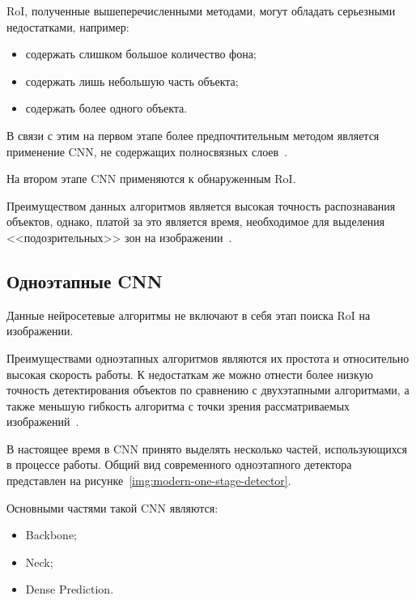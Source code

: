 RoI, полученные вышеперечисленными методами, могут обладать серьезными недостатками, например:
\begin{itemize}[label=---]
    \item содержать слишком большое количество фона;
    \item содержать лишь небольшую часть объекта;
    \item содержать более одного объекта.
\end{itemize}

В связи с этим на первом этапе более предпочтительным методом является применение CNN, не содержащих полносвязных слоев~\cite{realtime-recognition-algorythm}.

На втором этапе CNN применяются к обнаруженным RoI.

Преимуществом данных алгоритмов является высокая точность распознавания объектов, однако, платой за это является время, необходимое для выделения <<подозрительных>> зон на изображении~\cite{overview-of-two-stage-object-detection}.

\subsection{Одноэтапные CNN}

Данные нейросетевые алгоритмы не включают в себя этап поиска RoI на изображении.


Преимуществами одноэтапных алгоритмов являются их простота и относительно высокая скорость работы. К недостаткам же можно отнести более низкую точность детектирования объектов по сравнению с двухэтапными алгоритмами, а также меньшую гибкость алгоритма с точки зрения рассматриваемых изображений~\cite{review-on-one-stage-object-detection}.

В настоящее время в CNN принято выделять несколько частей, использующихся в процессе работы. Общий вид современного одноэтапного детектора представлен на рисунке~\ref{img:modern-one-stage-detector}.


Основными частями такой CNN являются:
\begin{itemize}[label=---]
    \item Backbone;
    \item Neck;
    \item Dense Prediction.
\end{itemize}


